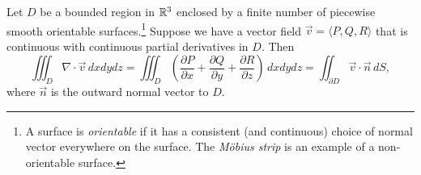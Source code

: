\begin{theorem}
  Let $D$ be a bounded region in $\mathbb{R}^3$ enclosed by a
  finite number of piecewise smooth orientable surfaces.\footnote{A surface is \emph{orientable} if it has a consistent (and continuous) choice of normal vector everywhere on the surface. The \emph{M\"obius strip} is an example of a non-orientable surface.}
  Suppose we have a vector field
  $\vec{v} = \langle P, Q, R \rangle$ that is
  continuous with continuous partial
  derivatives in $D$. Then
  \[
    \iiint_D \nabla \cdot \vec{v} \, dxdydz
    = \iiint_D \left( \frac{\partial P}{\partial x} + \frac{\partial Q}{\partial y} + \frac{\partial R}{\partial z} \right) \, dxdydz
    = \iint_{\partial D} \vec{v} \cdot \vec{n}\, dS,
  \]
  where $\vec{n}$ is the outward normal vector to $D$.
\end{theorem}

